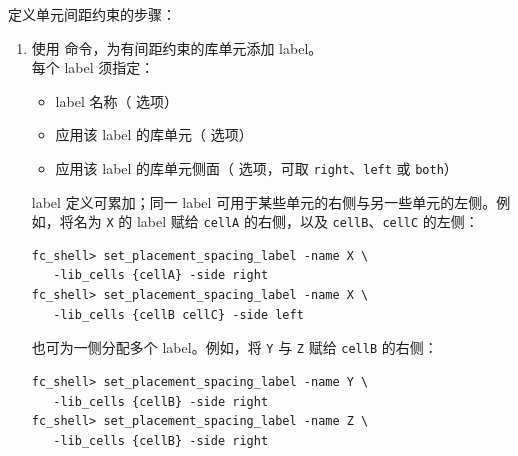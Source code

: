 定义单元间距约束的步骤：
\begin{enumerate}
  \item 使用  命令，为有间距约束的库单元添加 label。\\
        每个 label 须指定：
        \begin{itemize}
          \item label 名称（ 选项）
          \item 应用该 label 的库单元（ 选项）
          \item 应用该 label 的库单元侧面（ 选项，可取 \texttt{right}、\texttt{left} 或 \texttt{both}）
        \end{itemize}
        label 定义可累加；同一 label 可用于某些单元的右侧与另一些单元的左侧。例如，将名为 \texttt{X} 的 label 赋给 \texttt{cellA} 的右侧，以及 \texttt{cellB}、\texttt{cellC} 的左侧：
\begin{lstlisting}
fc_shell> set_placement_spacing_label -name X \
   -lib_cells {cellA} -side right
fc_shell> set_placement_spacing_label -name X \
   -lib_cells {cellB cellC} -side left
\end{lstlisting}
        也可为一侧分配多个 label。例如，将 \texttt{Y} 与 \texttt{Z} 赋给 \texttt{cellB} 的右侧：
\begin{lstlisting}
fc_shell> set_placement_spacing_label -name Y \
   -lib_cells {cellB} -side right
fc_shell> set_placement_spacing_label -name Z \
   -lib_cells {cellB} -side right
\end{lstlisting}


\end{enumerate}
